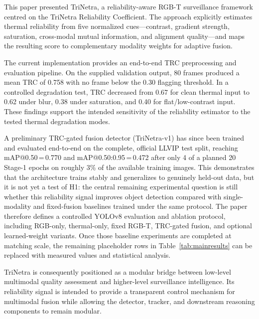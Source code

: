 \documentclass[conference]{IEEEtran}
\begin{document}
This paper presented TriNetra, a reliability-aware RGB-T surveillance framework centred on the TriNetra Reliability Coefficient. The approach explicitly estimates thermal reliability from five normalized cues---contrast, gradient strength, saturation, cross-modal mutual information, and alignment quality---and maps the resulting score to complementary modality weights for adaptive fusion.

The current implementation provides an end-to-end TRC preprocessing and evaluation pipeline. On the supplied validation output, 80 frames produced a mean TRC of 0.758 with no frame below the 0.30 flagging threshold. In a controlled degradation test, TRC decreased from 0.67 for clean thermal input to 0.62 under blur, 0.38 under saturation, and 0.40 for flat/low-contrast input. These findings support the intended sensitivity of the reliability estimator to the tested thermal degradation modes.

A preliminary TRC-gated fusion detector (TriNetra-v1) has since been
trained and evaluated end-to-end on the complete, official LLVIP test
split, reaching mAP@0.50\,=\,0.770 and mAP@0.50:0.95\,=\,0.472 after
only 4 of a planned 20 Stage-1 epochs on roughly 3\% of the available
training images. This demonstrates that the architecture trains
stably and generalizes to genuinely held-out data, but it is not yet
a test of H1: the central remaining experimental question is still
whether this reliability signal improves object detection compared
with single-modality and fixed-fusion baselines trained under the
same protocol. The paper therefore defines a controlled YOLOv8
evaluation and ablation protocol, including RGB-only, thermal-only,
fixed RGB-T, TRC-gated fusion, and optional learned-weight variants.
Once those baseline experiments are completed at matching scale, the
remaining placeholder rows in Table~\ref{tab:mainresults} can be
replaced with measured values and statistical analysis.

TriNetra is consequently positioned as a modular bridge between low-level multimodal quality assessment and higher-level surveillance intelligence. Its reliability signal is intended to provide a transparent control mechanism for multimodal fusion while allowing the detector, tracker, and downstream reasoning components to remain modular.

\end{document}
